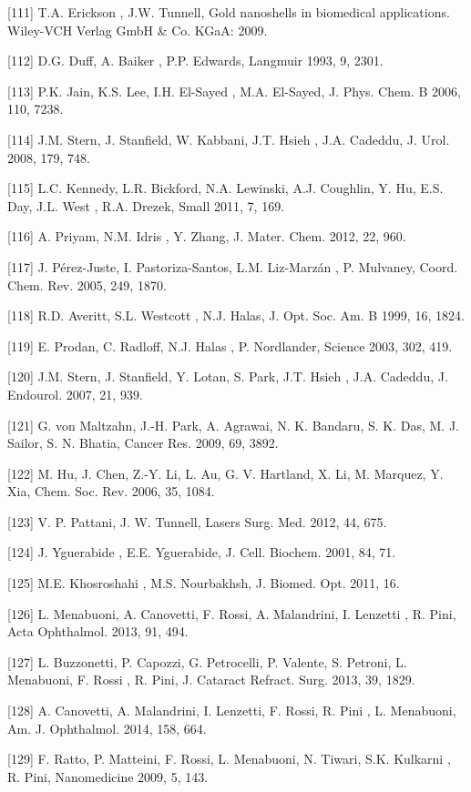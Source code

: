 [111]	T.A. Erickson , J.W. Tunnell, Gold nanoshells in biomedical applications. Wiley-VCH Verlag GmbH \& Co. KGaA: 2009.

[112]	D.G. Duff, A. Baiker , P.P. Edwards, Langmuir 1993, 9, 2301.

[113]	P.K. Jain, K.S. Lee, I.H. El-Sayed , M.A. El-Sayed, J. Phys. Chem. B 2006, 110, 7238.

[114]	J.M. Stern, J. Stanfield, W. Kabbani, J.T. Hsieh , J.A. Cadeddu, J. Urol. 2008, 179, 748.

[115]	L.C. Kennedy, L.R. Bickford, N.A. Lewinski, A.J. Coughlin, Y. Hu, E.S. Day, J.L. West , R.A. Drezek, Small 2011, 7, 169.

[116]	A. Priyam, N.M. Idris , Y. Zhang, J. Mater. Chem. 2012, 22, 960.

[117]	J. Pérez-Juste, I. Pastoriza-Santos, L.M. Liz-Marzán , P. Mulvaney, Coord. Chem. Rev. 2005, 249, 1870.

[118]	R.D. Averitt, S.L. Westcott , N.J. Halas, J. Opt. Soc. Am. B 1999, 16, 1824.

[119]	E. Prodan, C. Radloff, N.J. Halas , P. Nordlander, Science 2003, 302, 419.

[120]	J.M. Stern, J. Stanfield, Y. Lotan, S. Park, J.T. Hsieh , J.A. Cadeddu, J. Endourol. 2007, 21, 939.

[121]	G. von Maltzahn, J.-H. Park, A. Agrawai, N. K. Bandaru, S. K. Das, M. J. Sailor, S. N. Bhatia, Cancer Res. 2009, 69, 3892.

[122]	M. Hu, J. Chen, Z.-Y. Li, L. Au, G. V. Hartland, X. Li, M. Marquez, Y. Xia, Chem. Soc. Rev. 2006, 35, 1084.

[123]	V. P. Pattani, J. W. Tunnell, Lasers Surg. Med. 2012, 44, 675.

[124]	J. Yguerabide , E.E. Yguerabide, J. Cell. Biochem. 2001, 84, 71.

[125]	M.E. Khosroshahi , M.S. Nourbakhsh, J. Biomed. Opt. 2011, 16.

[126]	L. Menabuoni, A. Canovetti, F. Rossi, A. Malandrini, I. Lenzetti , R. Pini, Acta Ophthalmol. 2013, 91, 494.

[127]	L. Buzzonetti, P. Capozzi, G. Petrocelli, P. Valente, S. Petroni, L. Menabuoni, F. Rossi , R. Pini, J. Cataract Refract. Surg. 2013, 39, 1829.

[128]	A. Canovetti, A. Malandrini, I. Lenzetti, F. Rossi, R. Pini , L. Menabuoni, Am. J. Ophthalmol. 2014, 158, 664.

[129]	F. Ratto, P. Matteini, F. Rossi, L. Menabuoni, N. Tiwari, S.K. Kulkarni , R. Pini, Nanomedicine 2009, 5, 143.

